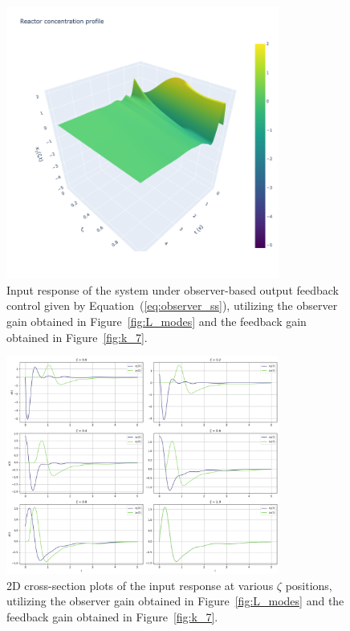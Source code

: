 \begin{figure}[!htbp]
    \centering
    \includegraphics[width=0.8\textwidth,trim=0 0 100 0,clip]{Figures/3D_x1_L_k7.png}
    \caption{Input response of the system under observer-based output feedback control given by Equation~(\ref{eq:observer_ss}), utilizing the observer gain obtained in Figure~\ref{fig:L_modes} and the feedback gain obtained in Figure~\ref{fig:k_7}.}
    \label{fig:3D_x1_L_k7}
\end{figure}

\begin{figure}[!htbp]
    \centering
    \includegraphics[width=0.8\textwidth]{Figures/2D_xt_L_k7.png}
    \caption{2D cross-section plots of the input response at various $\zeta$ positions, utilizing the observer gain obtained in Figure~\ref{fig:L_modes} and the feedback gain obtained in Figure~\ref{fig:k_7}.}
    \label{fig:2D_xt_L_k7}
\end{figure}

